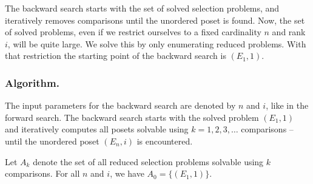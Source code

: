 \documentclass[twoside,leqno,twocolumn]{article}
\begin{document}
The backward search starts with the set of solved selection problems, and iteratively removes comparisons until the unordered poset is found.
Now, the set of solved problems, even if we restrict ourselves to a fixed cardinality $n$ and rank $i$, will be quite large.
We solve this by only enumerating reduced problems.
With that restriction the starting point of the backward search is $(E_1, 1)$.

%



\subsubsection{Algorithm.} \label{sec:backward:algorithm}
The input parameters for the backward search are denoted by $n$ and $i$, like in the forward search.
The backward search starts with the solved problem $(E_1, 1)$ and iteratively computes all posets solvable using $k = 1, 2, 3, \dots$ comparisons -- until the unordered poset $(E_n, i)$ is encountered.

Let $A_k$ denote the set of all reduced selection problems solvable using $k$ comparisons.
For all $n$ and $i$, we have $A_0 = \{ (E_1, 1) \}$.
\end{document}
